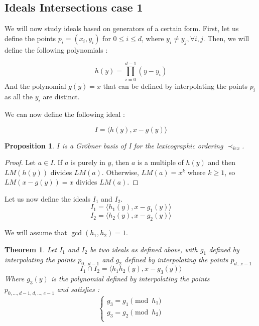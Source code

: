 \documentclass{article}
\newtheorem{theorem}{Theorem}[section]
\newtheorem{proposition}{Proposition}[section]
\begin{document}
\subsection{Ideals Intersections case 1}

We will now study ideals based on generators of a certain form. 
First, let us define the points $p_{i} = (x_{i}, y_{i})$ for $0 \leq i \leq d$, where $y_{i} \neq y_{j}, \forall i, j$. 
Then, we will define the following polynomials : 

\begin{displaymath}
    h(y) = \prod_{i=0}^{d-1} (y - y_{i}) 
\end{displaymath}
And the polynomial $g(y) = x$ that can be defined by interpolating the points $p_{i}$ as all the $y_{i}$ are distinct. 

We can now define the following ideal : 

\begin{displaymath}
    I = \langle h(y), x - g(y) \rangle
\end{displaymath}

\begin{proposition}
    $I$ is a Gröbner basis of I for the lexicographic ordering $\prec_{lex}$.  
\end{proposition}

\begin{proof}
    Let $a \in I$. If $a$ is purely in $y$, then $a$ is a multiple of $h(y)$ and then $LM(h(y))$ divides $LM(a)$. Otherwise, $LM(a) = x^{k}$ where $k \geq 1$, so $LM(x - g(y)) = x$ divides $LM(a)$.
\end{proof}

Let us now define the ideals $I_{1}$ and $I_{2}$. 
\begin{displaymath}
    I_{1} = \langle h_{1}(y), x - g_{1}(y) \rangle
\end{displaymath}
\begin{displaymath}
    I_{2} = \langle h_{2}(y), x - g_{2}(y) \rangle
\end{displaymath}

We will assume that $\gcd(h_{1}, h_{2}) = 1$.

\begin{theorem} 
    Let $I_{1}$ and $I_{2}$ be two ideals as defined above, with $g_{1}$ defined by interpolating the points $p_{0...d-1}$ and $g_{2}$ defined by interpolating the points $p_{d...e-1}$
    \begin{displaymath}
        I_{1} \cap I_{2} = \langle h_{1}h_{2}(y), x - g_{3}(y) \rangle
    \end{displaymath}
    Where $g_{3}(y)$ is the polynomial defined by interpolating the points $p_{0,...,d-1,d,...,e-1}$ and satisfies :
    \begin{displaymath}
    \left\{
    \begin{array}{ll}
        g_{3} = g_{1} \pmod {h_{1}} \\
        g_{3} = g_{2} \pmod {h_{2}} \\
    \end{array}
    \right.
    \end{displaymath} 
\end{theorem}
\end{document}
